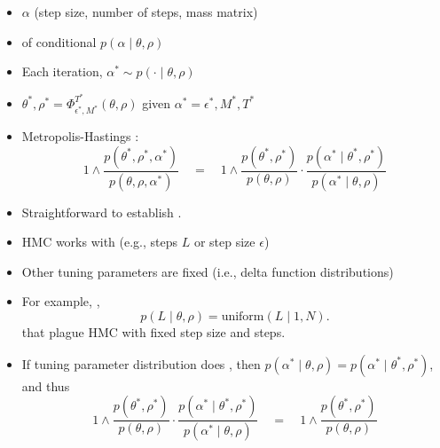 \documentclass[10pt]{report}
\begin{document}
\begin{itemize}
\item {} $\alpha$ (step
  size, number of steps, mass matrix)
\item {} of conditional  $p(\alpha \mid \theta, \rho)$
\item Each iteration,  $\alpha^* \sim p( \cdot \mid \theta,
  \rho)$
\item {} $\theta^*, \rho^* = \Phi^{T^*}_{\epsilon^*,
    M^*}(\theta, \rho)$ given $\alpha^* = \epsilon^*,
  M^*, T^*$
\item Metropolis-Hastings :
  $$
  1 \wedge
  \dfrac{p(\theta^*, \rho^*, \alpha^*)}
  {p(\theta, \rho, \alpha^*)}
  \quad = \quad
  1 \wedge
  \dfrac{p(\theta^*, \rho^*)}
  {p(\theta, \rho)}
  \cdot
  \dfrac{p(\alpha^* \mid \theta^*, \rho^*)}
       {p(\alpha^* \mid \theta, \rho)}
       $$
\item Straightforward to establish .
\end{itemize}

\begin{itemize}
\item HMC works with  (e.g., steps $L$ or
  step size $\epsilon$)
\item Other tuning parameters are fixed (i.e., delta function distributions)
\item For example, ,
  $$p(L \mid \theta, \rho) = \textrm{uniform}(L \mid 1, N).$$
 that plague HMC with fixed step size and steps.
\item If tuning parameter distribution does , then $p(\alpha^* \mid \theta, \rho) = p(\alpha^* \mid \theta^*,
  \rho^*)$, and thus
  $$
  1 \wedge
  \dfrac{p(\theta^*, \rho^*)}
       {p(\theta, \rho)}
  \cdot
  \dfrac{p(\alpha^* \mid \theta^*, \rho^*)}
       {p(\alpha^* \mid \theta, \rho)}
      \quad = \quad
       1 \wedge
       \dfrac{p(\theta^*, \rho^*)}{p(\theta, \rho)}
  $$       
\end{itemize}
\end{document}
